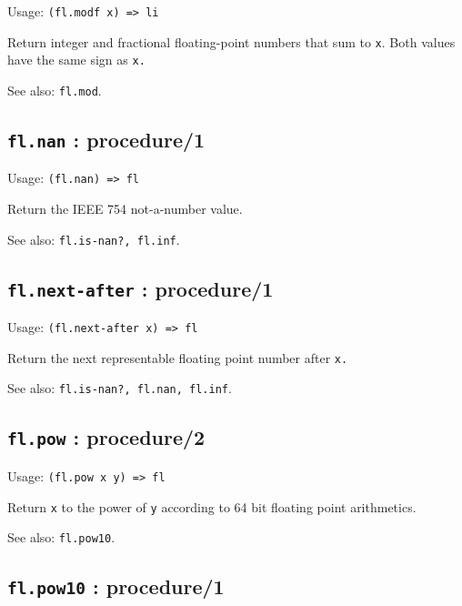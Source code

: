 \documentclass[
]{article}
\newcommand{\passthrough}[1]{#1}
\begin{document}
Usage: \passthrough{\lstinline!(fl.modf x) => li!}

Return integer and fractional floating-point numbers that sum to
\passthrough{\lstinline!x!}. Both values have the same sign as
\passthrough{\lstinline!x.!}

See also: \passthrough{\lstinline!fl.mod!}.

\hypertarget{fl.nan-procedure1-1}{%
\subsection{\texorpdfstring{\texttt{fl.nan} :
procedure/1}{fl.nan : procedure/1}}\label{fl.nan-procedure1-1}}

Usage: \passthrough{\lstinline!(fl.nan) => fl!}

Return the IEEE 754 not-a-number value.

See also: \passthrough{\lstinline!fl.is-nan?, fl.inf!}.

\hypertarget{fl.next-after-procedure1-1}{%
\subsection{\texorpdfstring{\texttt{fl.next-after} :
procedure/1}{fl.next-after : procedure/1}}\label{fl.next-after-procedure1-1}}

Usage: \passthrough{\lstinline!(fl.next-after x) => fl!}

Return the next representable floating point number after
\passthrough{\lstinline!x.!}

See also: \passthrough{\lstinline!fl.is-nan?, fl.nan, fl.inf!}.

\hypertarget{fl.pow-procedure2-1}{%
\subsection{\texorpdfstring{\texttt{fl.pow} :
procedure/2}{fl.pow : procedure/2}}\label{fl.pow-procedure2-1}}

Usage: \passthrough{\lstinline!(fl.pow x y) => fl!}

Return \passthrough{\lstinline!x!} to the power of
\passthrough{\lstinline!y!} according to 64 bit floating point
arithmetics.

See also: \passthrough{\lstinline!fl.pow10!}.

\hypertarget{fl.pow10-procedure1-1}{%
\subsection{\texorpdfstring{\texttt{fl.pow10} :
procedure/1}{fl.pow10 : procedure/1}}\label{fl.pow10-procedure1-1}}
\end{document}
